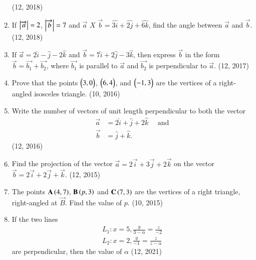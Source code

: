 \begin{enumerate}[label=\thesubsection.\arabic*, ref=\thesubsection.\theenumi]
\hfill (12, 2018) 
\item If $\left\vert\overrightarrow{a}\right\vert=2$, $\left\vert\overrightarrow{b}\right\vert=7$ and  $\overrightarrow{a}$ $X$ $\overrightarrow{b} =\hat{3i}+\hat{2j}+\hat{6k}$, find the angle between $\overrightarrow{a}$ and $\overrightarrow{b}$.
\hfill (12, 2018) 
    \item If $\vec{a} = 2\hat{i} - \hat{j} - 2\hat{k}$ and $\vec{b} = 7\hat{i} + 2\hat{j} - 3\hat{k}$, then express $\vec{b}$ in the form $\vec{b} = \vec{b_1} + \vec{b_2}$, where $\vec{b_1}$ is parallel to $\vec{a}$ and $\vec{b_2}$ is perpendicular to $\vec{a}$. \hfill (12, 2017)
    \item Prove that the points $\begin{pmatrix}3,0\end{pmatrix}$, $\begin{pmatrix}6,4\end{pmatrix}$, and $\begin{pmatrix}-1,3\end{pmatrix}$ are the vertices of a right-angled isosceles triangle. \hfill (10, 2016)
\item Write the number of vectors of unit length perpendicular to both the vector
      \begin{align*}
          \vec{a} & = 2 \hat{i} + \hat{j} +2\hat{k} \quad\text{ and} \\
          \vec{b} & = \hat{j}+\hat{k}.
      \end{align*} \hfill (12, 2016)
\item Find the projection of the vector $\vec{a}=2\vec{i}+3\vec{j}+2\vec{k}$ on the vector $\vec{b}=2\vec{i}+2\vec{j}+\vec{k}$. \hfill (12, 2015)
\item The points $\mathbf{A}\left(4, 7\right)$, $\mathbf{B}\left(p, 3\right)$ and $\mathbf{C}\left(7, 3\right)$ are the vertices of a right triangle, right-angled at $\vec{B}$. Find the value of $p$. \hfill (10, 2015)
\item If the two lines
\begin{align}
      L_1 : x=5,\frac{y}{3-\alpha}=\frac{z}{-2}\\
     L_2 : x=2,\frac{y}{-1}=\frac{z}{z-\alpha} 
   \end{align}
are perpendicular, then the value of $\alpha$ 
\hfill (12, 2021)
\end{enumerate}
